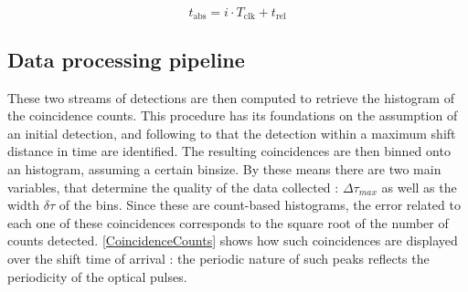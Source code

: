 \begin{equation}
    t_{\text{abs}} = i \cdot T_{\text{clk}} + t_{\text{rel}}
\label{eq:Timestamps}
\end{equation}

\subsection{Data processing pipeline}
\label{subsec:Pipeline}



These two streams of detections are then computed to retrieve the histogram of the coincidence counts. This procedure has its foundations on the assumption of an initial detection, and following to that the detection within a maximum shift distance in time are identified. The resulting coincidences are then binned onto an histogram, assuming a certain binsize. By these means there are two main variables, that determine the quality of the data collected : $\Delta \tau _{max}$ as well as the width $\delta \tau$ of the bins.
Since these are count-based histograms, the error related to each one of these coincidences corresponds to the square root of the number of counts detected.
\autoref{CoincidenceCounts} shows how such coincidences are displayed over the shift time of arrival : the periodic nature of such peaks reflects the periodicity of the optical pulses.

